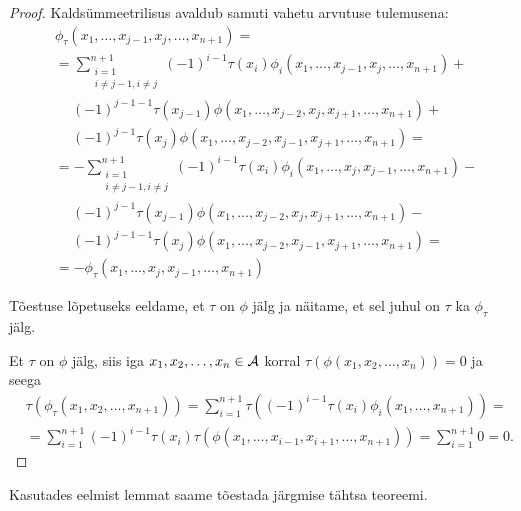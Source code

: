 \begin{proof}
    Kaldsümmeetrilisus avaldub samuti vahetu arvutuse tulemusena:
    \begin{align*}
        &\phi_\tau(
          x_1, \dots, x_{j-1}, x_j, \dots, x_{n+1}
        ) = \\
        &= \sum_{\substack{i=1\\i \ne j-1, i \ne j}}^{n+1}
          (-1)^{i-1} \tau(x_i) \phi_i(
              x_1, \dots, x_{j-1}, x_j, \dots, x_{n+1}
          ) + \\
        &\quad\ (-1)^{j-1-1} \tau(x_{j-1}) \phi(
              x_1, \dots, x_{j-2}, x_j, x_{j+1}, \dots, x_{n+1}
          ) + \\
        &\quad\ (-1)^{j-1} \tau(x_j) \phi(
              x_1, \dots, x_{j-2}, x_{j-1}, x_{j+1}, \dots, x_{n+1}
          ) = \\
        &= -\sum_{\substack{i=1\\i \ne j-1, i \ne j}}^{n+1}
          (-1)^{i-1} \tau(x_i) \phi_i(
              x_1, \dots, x_j, x_{j-1}, \dots, x_{n+1}
          ) - \\
        &\quad\ (-1)^{j-1} \tau(x_{j-1}) \phi(
              x_1, \dots, x_{j-2}, x_j, x_{j+1}, \dots, x_{n+1}
          ) - \\
        &\quad\ (-1)^{j-1-1} \tau(x_j) \phi(
              x_1, \dots, x_{j-2}, x_{j-1}, x_{j+1}, \dots, x_{n+1}
          ) = \\
        &= - \phi_\tau(
              x_1, \dots, x_j, x_{j-1}, \dots, x_{n+1}
            )
    \end{align*}

    Tõestuse lõpetuseks eeldame, et $\tau$ on $\phi$ jälg ja
    näitame, et sel juhul on $\tau$ ka $\phi_\tau$ jälg.

    Et $\tau$ on $\phi$ jälg, siis iga $x_1, x_2, \dots, x_n \in \mathcal{A}$
    korral $\tau(\phi(x_1, x_2, \dots, x_n)) = 0$ ja seega
    \begin{align*}
        &\tau(\phi_\tau(x_1, x_2, \dots, x_{n+1})) = 
        \sum_{i=1}^{n+1} \tau \left(
            (-1)^{i-1} \tau(x_i) \phi_i(x_1, \dots, x_{n+1})
        \right) = \\
        &= \sum_{i=1}^{n+1} (-1)^{i-1} \tau(x_i) \tau \left(
            \phi(x_1, \dots, x_{i-1}, x_{i+1}, \dots, x_{n+1})
        \right) = \sum_{i=1}^{n+1} 0 = 0.
    \end{align*}
\end{proof}

Kasutades eelmist lemmat saame tõestada järgmise tähtsa teoreemi.

